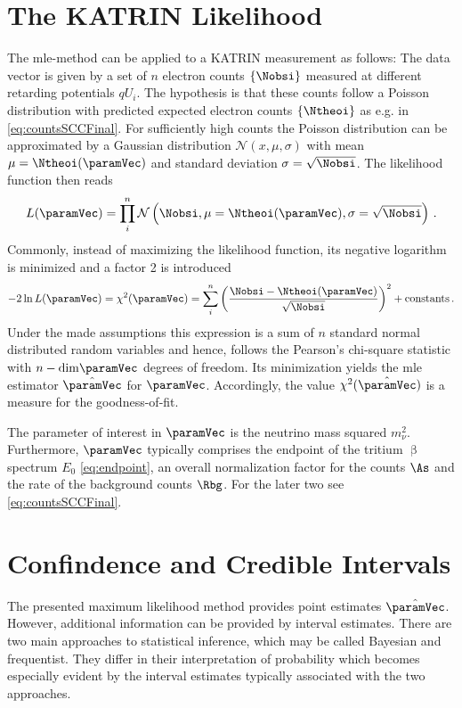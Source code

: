 \section{The KATRIN Likelihood}
The \gls{mle}-method can be applied to a KATRIN measurement as follows: The data vector is given by a set of $n$ electron counts $\left\{\Nobsi\right\}$ measured at different retarding potentials $qU_i$. The hypothesis is that these counts follow a Poisson distribution with predicted expected electron counts $\left\{\Ntheoi\right\}$ as e.g. in \eqref{eq:countsSCCFinal}. For sufficiently high counts the Poisson distribution can be approximated by a Gaussian distribution $\mathcal{N}(x,\mu, \sigma)$ with mean $\mu=\Ntheoi(\paramVec)$ and standard deviation $\sigma=\sqrt{\Nobsi}$. The likelihood function then reads
\begin{equation}
	\label{eq:KATRINlikelihood}
	L(\paramVec) = \prod_{i}^{n} \mathcal{N}\left(\Nobsi,\mu=\Ntheoi(\paramVec), \sigma=\sqrt{\Nobsi}\right)
	\fullstop
\end{equation}
Commonly, instead of maximizing the likelihood function, its negative logarithm is minimized and a factor 2 is introduced
\begin{equation}
	\label{eq:katrinChi2}
	-2\ln L(\paramVec) = \chi^2(\paramVec) = \sum_i^n
		\left( 
			\frac{\Nobsi-\Ntheoi(\paramVec)}{\sqrt{\Nobsi}}
		\right)^2
		 + \mathrm{constants}
		\fullstop
\end{equation}
Under the made assumptions this expression is a sum of $n$ standard normal distributed random variables and hence, follows the Pearson's chi-square statistic with $n-\mathrm{dim}\paramVec$ degrees of freedom. Its minimization yields the \gls{mle} estimator $\hat{\paramVec}$ for $\paramVec$. Accordingly, the value $\chi^2(\hat{\paramVec})$ is a measure for the goodness-of-fit.

The parameter of interest in $\paramVec$ is the neutrino mass squared $m_\nu^2$. Furthermore, $\paramVec$ typically comprises the endpoint of the tritium $\upbeta$ spectrum $E_0$ \eqref{eq:endpoint}, an overall normalization factor for the counts $\As$ and the rate of the background counts $\Rbg$. For the later two see \eqref{eq:countsSCCFinal}.

\section{Confindence and Credible Intervals}
The presented maximum likelihood method provides point estimates $\hat{\paramVec}$. However, additional information can be provided by interval estimates. There are two main approaches to statistical inference, which may be called Bayesian and frequentist. They differ in their interpretation of probability which becomes especially evident by the interval estimates typically associated with the two approaches.

